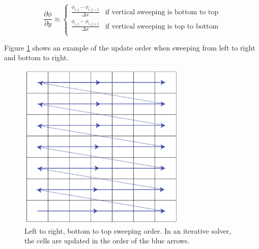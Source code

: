 \begin{equation}
\frac{\partial \phi}{\partial y} \approx
\left\{
\begin{array}{ll}
\frac{\phi_{i,j} - \phi_{i,j-1}}{\Delta x} & \mbox{if vertical sweeping is bottom to top} \\
\frac{\phi_{i,j} - \phi_{i,j+1}}{\Delta x} & \mbox{if vertical sweeping is top to bottom} \\
\end{array}
\right.
\end{equation}

Figure \ref{sweeppic} shows an example of the update order when sweeping from left to right and bottom to right.

\begin{figure}[ht!]
\centering
\includegraphics[width=80mm]{img/sweep.pdf}
\caption{Left to right, bottom to top sweeping order. In an iterative solver, the cells are updated in the order of the blue arrows.}
\label{sweeppic}
\end{figure}
